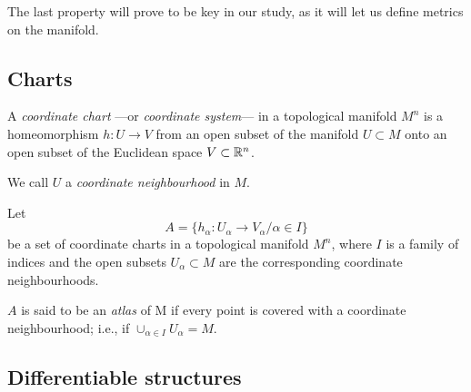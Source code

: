 
The last property will prove to be key in our study, as it will let us define metrics on the manifold.

\subsection{Charts}


\begin{definition}
    A \emph{coordinate chart} ---or \emph{coordinate system}--- in a topological manifold $M^n$ is a homeomorphism $h \colon U \to V$ from an open subset of the manifold $U \subset M$ onto an open subset of the Euclidean space $V \subset \mathbb{R}^n$.

    We call $U$ a \emph{coordinate neighbourhood} in $M$.
\end{definition}

\begin{definition}
    Let
    \[
    A = \{h_\alpha \colon U_\alpha \to V_\alpha / \alpha \in I\}
    \]
    be a set of coordinate charts in a topological manifold $M^n$, where $I$ is a family of indices and the open subsets $U_\alpha \subset M$ are the corresponding coordinate neighbourhoods.

    $A$ is said to be an \emph{atlas} of M if every point is covered with a coordinate neighbourhood; i.e., if $\cup_{\alpha \in I} U_\alpha = M$.
\end{definition}


\subsection{Differentiable structures}

\begin{definition}
\end{definition}

\begin{definition}
\end{definition}

\begin{definition}
\end{definition}

\begin{proposition}
\end{proposition}

\begin{definition}
\end{definition}

\begin{definition}
\end{definition}
